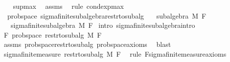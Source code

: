 \begin{isabellebody}
%
\isadelimproof
\ \ %
\endisadelimproof
%
\isatagproof
{}\isamarkupfalse%
\ sup{\isacharunderscore}{\kern0pt}max\ \isamarkupfalse%
\ assms\ \isamarkupfalse%
\ {\isacharparenleft}{\kern0pt}rule\ cond{\isacharunderscore}{\kern0pt}exp{\isacharunderscore}{\kern0pt}max{\isacharparenright}{\kern0pt}%
\endisatagproof
{\isafoldproof}%
%
\isadelimproof
\isanewline
%
\endisadelimproof
\isanewline
{}\isamarkupfalse%
%
\isadelimdocument
%
\endisadelimdocument
%
\isatagdocument
%
\isamarkuptrue%
%
\endisatagdocument
{\isafolddocument}%
%
\isadelimdocument
%
\endisadelimdocument
{}\isamarkupfalse%
\ {\isacharparenleft}{\kern0pt}\ prob{\isacharunderscore}{\kern0pt}space{\isacharparenright}{\kern0pt}\ sigma{\isacharunderscore}{\kern0pt}finite{\isacharunderscore}{\kern0pt}subalgebra{\isacharunderscore}{\kern0pt}restr{\isacharunderscore}{\kern0pt}to{\isacharunderscore}{\kern0pt}subalg{\isacharcolon}{\kern0pt}\isanewline
\ \ \ {\isachardoublequoteopen}subalgebra\ M\ F{\isachardoublequoteclose}\isanewline
\ \ \ {\isachardoublequoteopen}sigma{\isacharunderscore}{\kern0pt}finite{\isacharunderscore}{\kern0pt}subalgebra\ M\ F{\isachardoublequoteclose}\isanewline
%
\isadelimproof
%
\endisadelimproof
%
\isatagproof
{}\isamarkupfalse%
\ {\isacharparenleft}{\kern0pt}intro\ sigma{\isacharunderscore}{\kern0pt}finite{\isacharunderscore}{\kern0pt}subalgebra{\isachardot}{\kern0pt}intro{\isacharparenright}{\kern0pt}\isanewline
\ \ \isamarkupfalse%
\ F{\isacharcolon}{\kern0pt}\ prob{\isacharunderscore}{\kern0pt}space\ {\isachardoublequoteopen}restr{\isacharunderscore}{\kern0pt}to{\isacharunderscore}{\kern0pt}subalg\ M\ F{\isachardoublequoteclose}\ \isamarkupfalse%
\ assms\ prob{\isacharunderscore}{\kern0pt}space{\isacharunderscore}{\kern0pt}restr{\isacharunderscore}{\kern0pt}to{\isacharunderscore}{\kern0pt}subalg\ prob{\isacharunderscore}{\kern0pt}space{\isacharunderscore}{\kern0pt}axioms\ \isamarkupfalse%
\ blast\isanewline
\ \ \isamarkupfalse%
\ {\isachardoublequoteopen}sigma{\isacharunderscore}{\kern0pt}finite{\isacharunderscore}{\kern0pt}measure\ {\isacharparenleft}{\kern0pt}restr{\isacharunderscore}{\kern0pt}to{\isacharunderscore}{\kern0pt}subalg\ M\ F{\isacharparenright}{\kern0pt}{\isachardoublequoteclose}\ \isamarkupfalse%
\ {\isacharparenleft}{\kern0pt}rule\ F{\isachardot}{\kern0pt}sigma{\isacharunderscore}{\kern0pt}finite{\isacharunderscore}{\kern0pt}measure{\isacharunderscore}{\kern0pt}axioms{\isacharparenright}{\kern0pt}\isanewline

\end{isabellebody}

